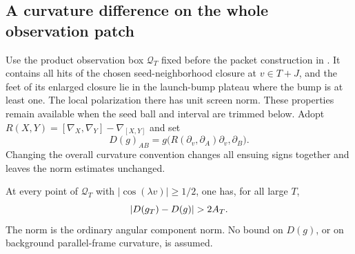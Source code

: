 \subsection{A curvature difference on the whole observation patch}

Use the product observation box $\mathcal Q_T$ fixed before the packet
construction in . It contains all hits of the chosen
seed-neighborhood closure at $v\in T+J$, and the feet of its enlarged
closure lie in the launch-bump plateau where the bump is at least one.
The local polarization there has unit screen norm. These properties
remain available when the seed ball and interval are trimmed below.
Adopt $R(X,Y)=[\nabla_X,\nabla_Y]-\nabla_{[X,Y]}$ and set
\begin{equation}\label{at:D-definition}
 D(g)_{AB}=g\bigl(R(\partial_v,\partial_A)\partial_v,
                                                    \partial_B\bigr).
\end{equation}
Changing the overall curvature convention changes all ensuing
signs together and leaves the norm estimates unchanged.

\begin{proposition}
\label{prop:curvature-signal}
At every point of $\mathcal Q_T$ with
$|\cos(\lambda v)|\ge1/2$, one has, for all large $T$,
\begin{equation}\label{at:signal}
 |D(g_T)-D(g)|>2\amp.
\end{equation}
The norm is the ordinary angular component norm. No bound on
$D(g)$, or on background parallel-frame curvature, is assumed.
\end{proposition}

